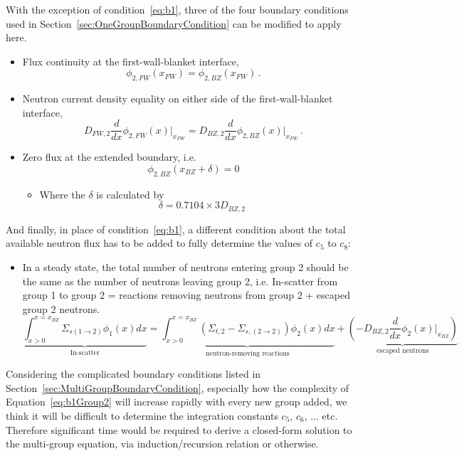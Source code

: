 \documentclass[a4paper, 12pt]{article}
\begin{document}
With the exception of condition~\ref{eq:b1}, three of the four boundary conditions used in Section~\ref{sec:OneGroupBoundaryCondition} can be modified to apply here.
\begin{itemize}
    \item Flux continuity at the first-wall-blanket interface,
    \begin{equation}\label{eq:b2Group2}
        \phi_{2,FW}(x_{FW})=\phi_{2,BZ}(x_{FW}) \,.
    \end{equation}
    \item Neutron current density equality on either side of the first-wall-blanket interface,
    \begin{equation}
         D_{FW,2} \frac{d}{dx}\phi_{2,FW}(x)\Bigg|_{x_{FW}} = D_{BZ,2} \frac{d}{dx}\phi_{2,BZ}(x)\Bigg|_{x_{FW}}\,.
    \end{equation}
    \item Zero flux at the extended boundary, i.e.
    \begin{equation}
        \phi_{2,BZ}(x_{BZ} + \delta) = 0
    \end{equation}
    \begin{itemize}
        \item Where the $\delta$ is calculated by $$\delta = 0.7104\times 3D_{BZ,2}$$
    \end{itemize}
\end{itemize}
And finally, in place of condition~\ref{eq:b1}, a different condition about the total available neutron flux has to be added to fully determine the values of $c_5$ to $c_8$:
\begin{itemize}
    \item In a steady state, the total number of neutrons entering group 2 should be the same as the number of neutrons leaving group 2, i.e.
    In-scatter from group 1 to group 2 = reactions removing neutrons from group 2 + escaped group 2 neutrons.
    \begin{equation}\label{eq:b1Group2}
        \underbrace{\int_{x>0}^{x=x_{BZ}} \Sigma_{s(1\rightarrow 2)} \phi_1(x) dx}_{\text{In-scatter}} = \underbrace{\int_{x>0}^{x=x_{BZ}} (\Sigma_{t,2} - \Sigma_{s,(2\rightarrow 2)}) \phi_2(x) dx}_{\text{neutron-removing reactions}} + \underbrace{\left(-D_{BZ,2} \frac{d}{dx}\phi_2(x)\Bigg|_{x_{BZ}}\right)}_{\text{escaped neutrons}}
    \end{equation}
\end{itemize}

Considering the complicated boundary conditions listed in Section~\ref{sec:MultiGroupBoundaryCondition}, especially how the complexity of Equation~\ref{eq:b1Group2} will increase rapidly with every new group added, we think it will be difficult to determine the integration constants $c_5$, $c_6$, $\ldots$ etc. Therefore significant time would be required to derive a closed-form solution to the multi-group equation, via induction/recursion relation or otherwise.
\end{document}
